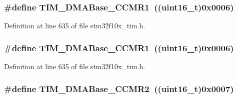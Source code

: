 \subsubsection[{\texorpdfstring{T\+I\+M\+\_\+\+D\+M\+A\+Base\+\_\+\+C\+C\+M\+R1}{TIM_DMABase_CCMR1}}]{\setlength{\rightskip}{0pt plus 5cm}\#define T\+I\+M\+\_\+\+D\+M\+A\+Base\+\_\+\+C\+C\+M\+R1~(({\bf uint16\+\_\+t})0x0006)}\hypertarget{group___t_i_m___d_m_a___base__address_gaab384496cff3e54d8179fc0db727c7ee}{}\label{group___t_i_m___d_m_a___base__address_gaab384496cff3e54d8179fc0db727c7ee}


Definition at line 635 of file stm32f10x\+\_\+tim.\+h.

\subsubsection[{\texorpdfstring{T\+I\+M\+\_\+\+D\+M\+A\+Base\+\_\+\+C\+C\+M\+R1}{TIM_DMABase_CCMR1}}]{\setlength{\rightskip}{0pt plus 5cm}\#define T\+I\+M\+\_\+\+D\+M\+A\+Base\+\_\+\+C\+C\+M\+R1~(({\bf uint16\+\_\+t})0x0006)}\hypertarget{group___t_i_m___d_m_a___base__address_gaab384496cff3e54d8179fc0db727c7ee}{}\label{group___t_i_m___d_m_a___base__address_gaab384496cff3e54d8179fc0db727c7ee}


Definition at line 635 of file stm32f10x\+\_\+tim.\+h.

\subsubsection[{\texorpdfstring{T\+I\+M\+\_\+\+D\+M\+A\+Base\+\_\+\+C\+C\+M\+R2}{TIM_DMABase_CCMR2}}]{\setlength{\rightskip}{0pt plus 5cm}\#define T\+I\+M\+\_\+\+D\+M\+A\+Base\+\_\+\+C\+C\+M\+R2~(({\bf uint16\+\_\+t})0x0007)}\hypertarget{group___t_i_m___d_m_a___base__address_ga4989f74592ab359f30bd7c4a4a457571}{}\label{group___t_i_m___d_m_a___base__address_ga4989f74592ab359f30bd7c4a4a457571}


